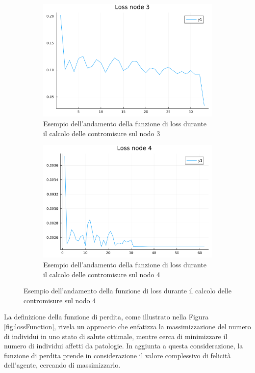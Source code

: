 \begin{figure}[!hb]
\begin{subfigure}[b]{0.45\textwidth}
		\includegraphics[width=\textwidth]{img/loss3.png}
		\caption{Esempio dell'andamento della funzione di loss durante il calcolo delle contromisure sul nodo 3}
		\label{fig:loss3}
	\end{subfigure}
	\hfill
	\begin{subfigure}[b]{0.45\textwidth}
		\centering
		\includegraphics[width=\textwidth]{img/loss4.png}
		\caption{Esempio dell'andamento della funzione di loss durante il calcolo delle contromisure sul nodo 4}
		\label{fig:loss4}
	\end{subfigure}
\end{figure}

La definizione della funzione di perdita, come illustrato nella Figura 
\ref{fig:lossFunction}, rivela un approccio che enfatizza la 
massimizzazione del numero di individui in uno stato di salute ottimale, 
mentre cerca di minimizzare il numero di individui affetti da patologie. 
In aggiunta a questa considerazione, la funzione di perdita prende in 
considerazione il valore complessivo di felicità dell'agente, cercando di 
massimizzarlo. 

